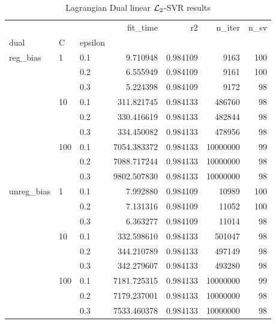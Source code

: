 \begin{table}[H]
\centering
\caption{Lagrangian Dual linear $\protect \mathcal{L}_2$-SVR results}
\label{linear_lagrangian_dual_l2_svr_cv_results}
\begin{tabular}{lllrrrr}
\toprule
           &     &     &     fit\_time &        r2 &    n\_iter &  n\_sv \\
dual & C & epsilon &              &           &           &       \\
\midrule
reg\_bias & 1   & 0.1 &     9.710948 &  0.984109 &      9163 &   100 \\
           &     & 0.2 &     6.555949 &  0.984109 &      9161 &   100 \\
           &     & 0.3 &     5.224398 &  0.984109 &      9172 &    98 \\
           & 10  & 0.1 &   311.821745 &  0.984133 &    486760 &    98 \\
           &     & 0.2 &   330.416619 &  0.984133 &    482844 &    98 \\
           &     & 0.3 &   334.450082 &  0.984133 &    478956 &    98 \\
           & 100 & 0.1 &  7054.383372 &  0.984133 &  10000000 &    99 \\
           &     & 0.2 &  7088.717244 &  0.984133 &  10000000 &    98 \\
           &     & 0.3 &  9802.507830 &  0.984133 &  10000000 &    98 \\
unreg\_bias & 1   & 0.1 &     7.992880 &  0.984109 &     10989 &   100 \\
           &     & 0.2 &     7.131316 &  0.984109 &     11052 &   100 \\
           &     & 0.3 &     6.363277 &  0.984109 &     11014 &    98 \\
           & 10  & 0.1 &   332.598610 &  0.984133 &    501047 &    98 \\
           &     & 0.2 &   344.210789 &  0.984133 &    497149 &    98 \\
           &     & 0.3 &   342.279607 &  0.984133 &    493280 &    98 \\
           & 100 & 0.1 &  7181.725315 &  0.984133 &  10000000 &    99 \\
           &     & 0.2 &  7179.237001 &  0.984133 &  10000000 &    98 \\
           &     & 0.3 &  7533.460378 &  0.984133 &  10000000 &    98 \\
\bottomrule
\end{tabular}
\end{table}
